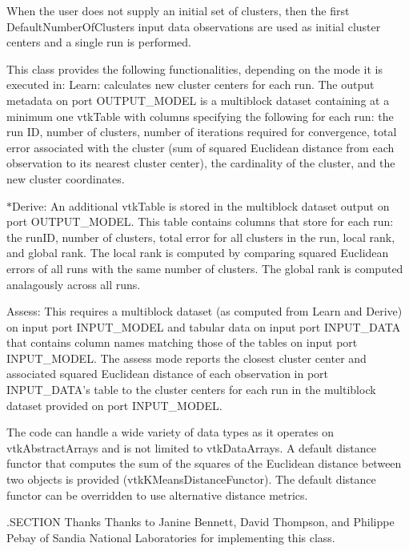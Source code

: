 When the user does not supply an initial set of clusters, then the first Default\-Number\-Of\-Clusters input data observations are used as initial cluster centers and a single run is performed.

This class provides the following functionalities, depending on the mode it is executed in\-: Learn\-: calculates new cluster centers for each run. The output metadata on port O\-U\-T\-P\-U\-T\-\_\-\-M\-O\-D\-E\-L is a multiblock dataset containing at a minimum one vtk\-Table with columns specifying the following for each run\-: the run I\-D, number of clusters, number of iterations required for convergence, total error associated with the cluster (sum of squared Euclidean distance from each observation to its nearest cluster center), the cardinality of the cluster, and the new cluster coordinates.

$\ast$\-Derive\-: An additional vtk\-Table is stored in the multiblock dataset output on port O\-U\-T\-P\-U\-T\-\_\-\-M\-O\-D\-E\-L. This table contains columns that store for each run\-: the run\-I\-D, number of clusters, total error for all clusters in the run, local rank, and global rank. The local rank is computed by comparing squared Euclidean errors of all runs with the same number of clusters. The global rank is computed analagously across all runs.

Assess\-: This requires a multiblock dataset (as computed from Learn and Derive) on input port I\-N\-P\-U\-T\-\_\-\-M\-O\-D\-E\-L and tabular data on input port I\-N\-P\-U\-T\-\_\-\-D\-A\-T\-A that contains column names matching those of the tables on input port I\-N\-P\-U\-T\-\_\-\-M\-O\-D\-E\-L. The assess mode reports the closest cluster center and associated squared Euclidean distance of each observation in port I\-N\-P\-U\-T\-\_\-\-D\-A\-T\-A's table to the cluster centers for each run in the multiblock dataset provided on port I\-N\-P\-U\-T\-\_\-\-M\-O\-D\-E\-L.

The code can handle a wide variety of data types as it operates on vtk\-Abstract\-Arrays and is not limited to vtk\-Data\-Arrays. A default distance functor that computes the sum of the squares of the Euclidean distance between two objects is provided (vtk\-K\-Means\-Distance\-Functor). The default distance functor can be overridden to use alternative distance metrics.

.S\-E\-C\-T\-I\-O\-N Thanks Thanks to Janine Bennett, David Thompson, and Philippe Pebay of Sandia National Laboratories for implementing this class.

